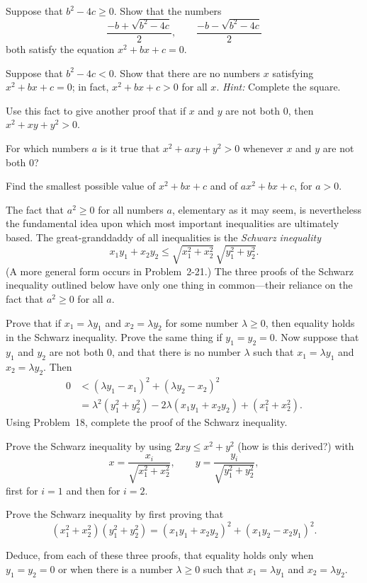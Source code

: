 \begin{letters}
\item Suppose that $b^2 - 4c \geq 0$. Show that the numbers
\[ \frac{-b + \sqrt{b^2 - 4c}}{2}, \qquad \frac{-b - \sqrt{b^2 - 4c}}{2} \]
both satisfy the equation $x^2 + bx + c = 0$.
\item Suppose that $b^2 - 4c < 0$. Show that there are no numbers $x$
  satisfying $x^2 + bx + c = 0$; in fact, $x^2 + bx + c > 0$ for all $x$.
  \textit{Hint:} Complete the square.
\item Use this fact to give another proof that if $x$ and $y$ are not both
  $0$, then $x^2 + xy + y^2 > 0$.
\item For which numbers $a$ is it true that $x^2 + axy + y^2 > 0$ whenever
  $x$ and $y$ are not both $0$?
\item Find the smallest possible value of $x^2 + bx + c$ and of
  $ax^2 + bx + c$, for $a > 0$.
\end{letters}

 The fact that $a^2 \geq 0$ for all numbers $a$, elementary as it
may seem, is nevertheless the fundamental idea upon which most important
inequalities are ultimately based. The great-granddaddy of all inequalities
is the \emph{Schwarz inequality}
\[
x_1 y_1 + x_2 y_2
\leq \sqrt{x_1^2 + x_2^2}\,\sqrt{y_1^2 + y_2^2}.
\]
(A more general form occurs in Problem~2-21.) The three proofs of the Schwarz
inequality outlined below have only one thing in common---their reliance on
the fact that $a^2 \geq 0$ for all $a$.

\begin{letters}
\item Prove that if $x_1 = \lambda y_1$ and $x_2 = \lambda y_2$ for some
  number $\lambda \geq 0$, then equality holds in the Schwarz inequality.
  Prove the same thing if $y_1 = y_2 = 0$. Now suppose that $y_1$ and $y_2$
  are not both $0$, and that there is no number $\lambda$ such that
  $x_1 = \lambda y_1$ and $x_2 = \lambda y_2$. Then
  \begin{align*}
  0 &< (\lambda y_1 - x_1)^2 + (\lambda y_2 - x_2)^2\\
    &= \lambda^2(y_1^2 + y_2^2) - 2\lambda(x_1 y_1 + x_2 y_2)
       + (x_1^2 + x_2^2).
  \end{align*}
  Using Problem~18, complete the proof of the Schwarz inequality.
\item Prove the Schwarz inequality by using $2xy \leq x^2 + y^2$ (how is this
  derived?) with
  \[
  x = \frac{x_i}{\sqrt{x_1^2 + x_2^2}},
  \qquad
  y = \frac{y_i}{\sqrt{y_1^2 + y_2^2}},
  \]
  first for $i = 1$ and then for $i = 2$.
\item Prove the Schwarz inequality by first proving that
  \[
  (x_1^2 + x_2^2)(y_1^2 + y_2^2)
  = (x_1 y_1 + x_2 y_2)^2 + (x_1 y_2 - x_2 y_1)^2.
  \]
\item Deduce, from each of these three proofs, that equality holds only when
  $y_1 = y_2 = 0$ or when there is a number $\lambda \geq 0$ such that
  $x_1 = \lambda y_1$ and $x_2 = \lambda y_2$.
\end{letters}

